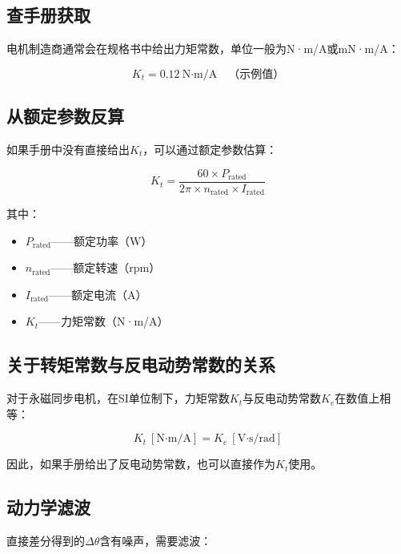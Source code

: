 \subsection{查手册获取}

电机制造商通常会在规格书中给出力矩常数，单位一般为N·m/A或mN·m/A：

\begin{equation}
K_t = 0.12\ \text{N·m/A} \quad \text{（示例值）}
\label{eq:kt_example}
\end{equation}

\subsection{从额定参数反算}

如果手册中没有直接给出$K_t$，可以通过额定参数估算：

\begin{equation}
K_t = \frac{60 \times P_{\text{rated}}}{2\pi \times n_{\text{rated}} \times I_{\text{rated}}}
\label{eq:kt_calc}
\end{equation}

其中：
\begin{itemize}
  \item $P_{\text{rated}}$——额定功率（W）
  \item $n_{\text{rated}}$——额定转速（rpm）
  \item $I_{\text{rated}}$——额定电流（A）
  \item $K_t$——力矩常数（N·m/A）
\end{itemize}

\subsection{关于转矩常数与反电动势常数的关系}

对于永磁同步电机，在SI单位制下，力矩常数$K_t$与反电动势常数$K_e$在数值上相等：

\begin{equation}
K_t\ [\text{N·m/A}] = K_e\ [\text{V·s/rad}]
\label{eq:kt_ke}
\end{equation}

因此，如果手册给出了反电动势常数，也可以直接作为$K_t$使用。

\subsection{动力学滤波}

直接差分得到的$\Delta\theta$含有噪声，需要滤波：

